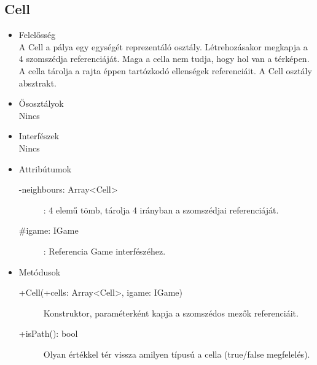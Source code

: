 \subsection{Cell}
\begin{itemize}
\item Felelősség\\
A Cell a pálya egy egységét reprezentáló osztály. Létrehozásakor megkapja a 4 szomszédja referenciáját. Maga a cella nem tudja, hogy hol van a térképen. A cella tárolja a rajta éppen tartózkodó ellenségek referenciáit. A Cell osztály absztrakt.
\item Ősosztályok\\
Nincs
\item Interfészek\\
Nincs
\item Attribútumok\\
	\begin{description}
		\item[-neighbours: Array<Cell>]: 4 elemű tömb, tárolja 4 irányban a szomszédjai referenciáját.  
		\item[#igame: IGame]: Referencia Game interfészéhez.

		
	\end{description}
\item Metódusok\\
	\begin{description}
		
		\item[+Cell(+cells: Array<Cell>, igame: IGame)] Konstruktor, paraméterként kapja a szomszédos mezők referenciáit. 
		\item[+isPath(): bool] Olyan értékkel tér vissza amilyen típusú a cella (true/false megfelelés). 
		
		
	\end{description}
\end{itemize}
